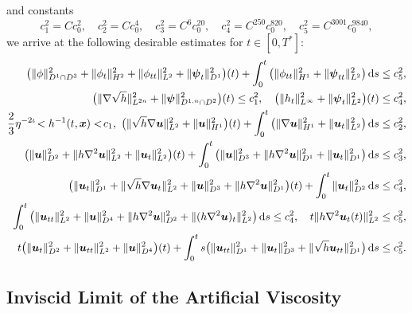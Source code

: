 \documentclass[11pt,reqno]{amsart}
\numberwithin{rk}{section}
\numberwithin{prop}{section}
\numberwithin{mydef}{section}
\numberwithin{lem}{section}
\numberwithin{equation}{section}
\numberwithin{thm}{section}
\begin{document}
and constants
\begin{equation*}
c_1^2=Cc^2_0,\quad  c_2^2=Cc^4_0,\quad c_3^2=C^{6}c^{20}_0,\quad
c_4^2=C^{250}c^{820}_0,\quad c_5^2=C^{3001}c^{9840}_0,
\end{equation*}
we arrive at  the following desirable estimates  for $t\in [0,T^*]$:
\begin{align}
\big(\|\phi\|^2_{D^1\cap D^3}+\|\phi_t\|^2_{H^2}+
\|\phi_{tt}\|^2_{L^2}+\|\boldsymbol{\psi}_t\|^2_{D^1}\big)(t)+\int^t_0\big(\|\phi_{tt}\|^2_{H^1}+\|\boldsymbol{\psi}_{tt}\|^2_{L^2}\big)\,\mathrm{d}s\leq  c_5^2,\notag\\
\big(\|\nabla\sqrt{h}\|^2_{L^{2n}}+
\|\boldsymbol{\psi}\|^2_{D^{1,n}\cap D^2}\big)(t)\leq c^2_1,\quad \big(\|h_t\|_{L^\infty}^2+\|\boldsymbol{\psi}_t\|^2_{L^2}\big)(t)\leq  c_4^2,\notag\\
\frac{2}{3}\eta^{-2\iota}\!<h^{-1}(t,\boldsymbol{x})<\!c_1, \  
\big(\|\sqrt{h}\nabla \boldsymbol{u}\|^2_{L^2}+\|\boldsymbol{u}\|^2_{H^1}\big)(t)+\int^t_0\big(\|\nabla \boldsymbol{u}\|^2_{H^1}+\|\boldsymbol{u}_t\|^2_{L^2}\big)\,\mathrm{d}s\leq c_2^2,\notag\\
\big(\|\boldsymbol{u}\|_{D^2}^2+\|h\nabla^2\boldsymbol{u}\|^2_{L^2}+\|\boldsymbol{u}_t\|^2_{L^2}\big)(t)+\int^t_0\big(\|\boldsymbol{u}\|^2_{D^3}+\|h\nabla^2\boldsymbol{u}\|_{D^1}^2+\|\boldsymbol{u}_t\|^2_{D^1}\big)\,\mathrm{d}s\leq  c_3^2,\label{key1kk}\\
\big(\|\boldsymbol{u}_t\|^2_{D^1}+\|\sqrt{h}\nabla \boldsymbol{u}_t\|^2_{L^2}+\|\boldsymbol{u}\|^2_{D^3}+\|h\nabla^2\boldsymbol{u}\|^2_{D^1}\big)(t)+\int^t_0\|\boldsymbol{u}_t\|^2_{D^2}\,\mathrm{d}s\leq  c_4^2,\notag\\
\int^t_0\big(\|\boldsymbol{u}_{tt}\|^2_{L^2}+\|\boldsymbol{u}\|^2_{D^4}+\|h\nabla^2\boldsymbol{u}\|^2_{D^2}+\|(h\nabla^2\boldsymbol{u})_t\|^2_{L^2}\big)\,\mathrm{d}s\leq  c_4^2,\quad t\|h\nabla^2\boldsymbol{u}_t(t)\|^2_{L^2}\leq  c_5^2,\notag\\
t\big(\|\boldsymbol{u}_t\|^2_{D^2}+\|\boldsymbol{u}_{tt}\|^2_{L^2}+\|\boldsymbol{u}\|^2_{D^4}\big)(t)+
\int^t_0s\big(\|\boldsymbol{u}_{tt}\|_{D^1}^2+\|\boldsymbol{u}_t\|^2_{D^3}+\|\sqrt{h} \boldsymbol{u}_{tt}\|_{D^1}^2\big)\,\mathrm{d}s\leq  c_5^2.\notag
\end{align}


\subsection{Inviscid Limit of the Artificial Viscosity}
\end{document}
